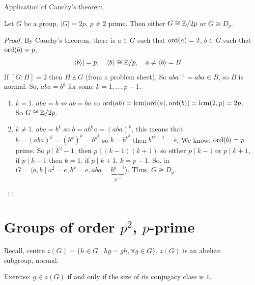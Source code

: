 \documentclass[10pt, a4paper]{article}
\begin{document}
Application of Cauchy's theorem.
\begin{proposition}
    Let $G$ be a group,
    $|G| = 2p$,
    $p \neq 2$ prime.
    Then either $G \cong \mathbb{Z} / 2p$ or $G \cong D_p$.

    \begin{proof}
        By Cauchy's theorem,
        there is $a \in G$ such that $\operatorname{ord}(a) = 2$,
        $b \in G$ such that $\operatorname{ord}(b) = p$.
        \[
        |\langle b\rangle| = p,\quad \langle b\rangle \cong \mathbb{Z} / p,\quad a \neq \langle b\rangle = B.
        \]
        If $[G : H] = 2$ then $H \vartriangle G$
        (from a problem sheet).
        So $aba ^ {-1} = aba \in B$,
        so $B$ is normal.
        So,
        $aba = b ^ k$ for some $k = 1, \dotsc, p - 1$.

        \begin{enumerate}[label = (\arabic*)]
            \item $k = 1$.
            $aba = b \iff ab = ba$ so $\operatorname{ord}(ab) = \operatorname{lcm}(\operatorname{ord}(a), \operatorname{ord}(b)) = \operatorname{lcm}(2, p) = 2p$.
            So $G \cong \mathbb{Z} / 2p$.

            \item $k \neq 1$.
            $aba = b ^ k$ so $b = ab ^ ka = (aba) ^ k$,
            this means that $b = (aba) ^ k = (b ^ k) ^ k = b ^ {k ^ 2}$ so $b = b ^ {k ^ 2}$ then $b ^ {k ^ 2 - 1} = e$.
            We know:
            $\operatorname{ord}(b) = p$ prime.
            So $p \mid k ^ 2 - 1$,
            then $p \mid (k - 1)(k + 1)$ so either $p \mid k - 1$ or $p \mid k + 1$,
            if $p \mid k - 1$ then $k = 1$,
            if $p \mid k + 1$,
            $k = p - 1$.
            So,
            in $G = \langle a, b \mid a ^ 2 = e, b ^ k = e, aba = \underbrace{b ^ {p - 1}}_{b ^ {-1}}\rangle$.
            Thus,
            $G \cong D_p$.
        \end{enumerate}
    \end{proof}
\end{proposition}

\newpage

\section{Groups of order \texorpdfstring{$p ^ 2$}{},
\texorpdfstring{$p$}{}-prime}
Recall,
centre $z(G) = \{h \in G \mid hg = gh, \forall g \in G\}$,
$z(G)$ is an abelian subgroup,
normal.

Exercise:
$g \in z(G)$ if and only if the size of its conjugacy class is $1$.
\end{document}
